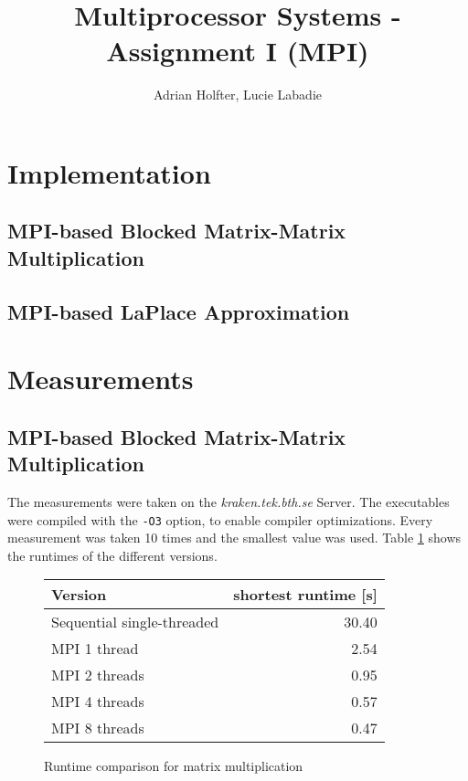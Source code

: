 \documentclass[]{article}
\title{Multiprocessor Systems - Assignment I (MPI)}
\author{Adrian Holfter, Lucie Labadie}
\begin{document}
\maketitle

\section{Implementation}

\subsection{MPI-based Blocked Matrix-Matrix Multiplication}

\subsection{MPI-based LaPlace Approximation}

\section{Measurements}

\subsection{MPI-based Blocked Matrix-Matrix Multiplication}

The measurements were taken on the \emph{kraken.tek.bth.se} Server. The executables were compiled with the \texttt{-O3} option, to enable compiler optimizations. Every measurement was taken 10 times and the smallest value was used. Table \ref{tab:matrix-mult-runtime} shows the runtimes of the different versions.

\begin{figure}
	\centering
	\begin{tabular}{|l|r|}
		\hline
		\textbf{Version} & \textbf{shortest runtime [s]} \\
		\hline
		Sequential single-threaded & 30.40 \\ 
		\hline 
		MPI 1 thread & 2.54 \\ 
		\hline 
		MPI 2 threads & 0.95 \\ 
		\hline 
		MPI 4 threads & 0.57 \\ 
		\hline 
		MPI 8 threads & 0.47 \\ 
		\hline 
	\end{tabular} 
	\caption{Runtime comparison for matrix multiplication}
	\label{tab:matrix-mult-runtime}
\end{figure}
\end{document}
